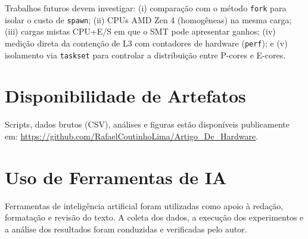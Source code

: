 \documentclass[12pt]{article}
\begin{document}
Trabalhos futuros devem investigar: (i) comparação com o método \texttt{fork}
para isolar o custo de \texttt{spawn}; (ii) CPUs AMD Zen 4 (homogêneas) na mesma
carga; (iii) cargas mistas CPU+E/S em que o SMT pode apresentar ganhos; (iv)
medição direta da contenção de L3 com contadores de hardware (\texttt{perf});
e (v) isolamento via \texttt{taskset} para controlar a distribuição entre
P-cores e E-cores.

\section*{Disponibilidade de Artefatos}

Scripts, dados brutos (CSV), análises e figuras estão disponíveis publicamente
em: \url{https://github.com/RafaelCoutinhoLima/Artigo_De_Hardware}.

\section*{Uso de Ferramentas de IA}

Ferramentas de inteligência artificial foram utilizadas como apoio à redação,
formatação e revisão do texto. A coleta dos dados, a execução dos experimentos
e a análise dos resultados foram conduzidas e verificadas pelo autor.



\end{document}
